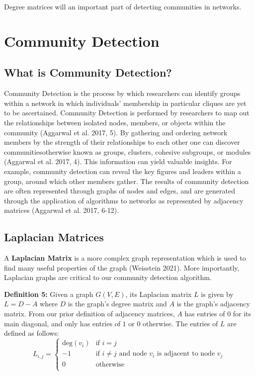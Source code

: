 \documentclass{article}
\begin{document}
\noindent Degree matrices will an important part of detecting communities in networks.

\bigskip 

\section{Community Detection}

\subsection{What is Community Detection?}

Community Detection is the process by which researchers can identify groups within a network in which individuals' membership in particular cliques are yet to be ascertained. 
Community Detection is performed by researchers to map out the relationships between isolated nodes, members, or objects within the community (Aggarwal et al. 2017, 5). 
By gathering and ordering network members by the strength of their relationships to each other one can discover communities\textemdash otherwise known as groups, clusters, cohesive subgroups, or modules (Aggarwal et al. 2017, 4). 
This information can yield valuable insights. For example, community detection can reveal the key figures and leaders within a group, around which other members gather.
The results of community detection are often represented through graphs of nodes and edges, and are generated through the application of algorithms to networks as represented by adjacency matrices (Aggarwal et al. 2017, 6-12).

\subsection{Laplacian Matrices}

A \textbf{Laplacian Matrix} is a more complex graph representation which is used to find many useful properties of the graph (Weisstein 2021). More importantly, Laplacian graphs are critical to our community detection algorithm.

\bigskip 

\textbf{Definition 5:} Given a graph $G(V, E)$, its Laplacian matrix $L$ is given by $L = D - A$ where $D$ is the graph's degree matrix and $A$ is the graph's adjacency matrix. From our prior definition of adjacency matrices, $A$ has entries of $0$ for its main diagonal, and only has entries of $1$ or $0$ otherwise. The entries of $L$ are defined as follows:
\[   
L_{i,j} = 
     \begin{cases}
       \text{deg} (v_i) & \text{if } i = j \\
       -1 & \text{if } i \neq j \text{ and} \text{ node } v_i \text{ is adjacent to} \text{ node } v_j\\
       0 & \text{otherwise} \\
     \end{cases}
\]
\end{document}
